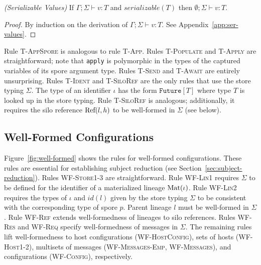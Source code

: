 \begin{thm}
\emph{(Serializable Values)}\label{lem:ser-values}
If $\Gamma ; \Sigma \vdash v : T$ and $serializable(T)$ then
$\emptyset ; \Sigma \vdash v : T$.
\end{thm}
\begin{proof}
By induction on the derivation of $\Gamma ; \Sigma \vdash v : T$. See
Appendix~\ref{app:ser-values}.
\end{proof}

Rule \textsc{T-AppSpore} is analogous to rule \textsc{T-App}. Rules
\textsc{T-Populate} and \textsc{T-Apply} are
straightforward; note that \verb|apply| is
polymorphic in the types of the captured variables of its spore
argument type. Rules \textsc{T-Send} and \textsc{T-Await} are
entirely unsurprising. Rules \textsc{T-Ident} and \textsc{T-SiloRef}
are the only rules that use the store typing $\Sigma$. The type of an
identifier $\iota$ has the form $\texttt{Future}[T]$ where type $T$ is
looked up in the store typing. Rule \textsc{T-SiloRef} is analogous;
additionally, it requires the silo reference ${\textrm{Ref}(l, h)}$ to be
well-formed in $\Sigma$ (see below).

\subsection{Well-Formed Configurations}

Figure~\ref{fig:well-formed} shows the rules for well-formed
configurations. These rules are essential for establishing subject
reduction (see Section~\ref{sec:subject-reduction}). Rules
\textsc{WF-Store1-3} are straightforward. Rule \textsc{WF-Lin1}
requires $\Sigma$ to be defined for the identifier of a materialized
lineage ${\textrm{Mat}(\iota)}$. Rule \textsc{WF-Lin2} requires the types of $\iota$ and $id(l)$
given by the store typing $\Sigma$ to be consistent with the
corresponding type of spore $p$. Parent lineage $l$ must be
well-formed in $\Sigma$. Rule \textsc{WF-Ref} extends well-formedness
of lineages to silo references. Rules \textsc{WF-Res} and
\textsc{WF-Req} specify well-formedness of messages in $\Sigma$. The
remaining rules lift well-formedness to host configurations
(\textsc{WF-HostConfig}), sets of hosts (\textsc{WF-Host1-2}),
multisets of messages (\textsc{WF-Messages-Emp},
\textsc{WF-Messages}), and configurations (\textsc{WF-Config}),
respectively.

